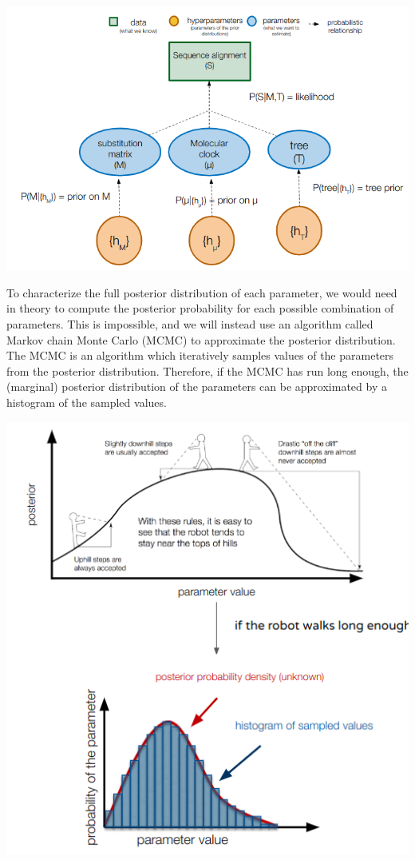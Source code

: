 \documentclass[
  letterpaper,
]{book}
\begin{document}
\includegraphics{assets/images/chapters/phylogenomics/24.png}

To characterize the full posterior distribution of each parameter, we
would need in theory to compute the posterior probability for each
possible combination of parameters. This is impossible, and we will
instead use an algorithm called Markov chain Monte Carlo (MCMC) to
approximate the posterior distribution. The MCMC is an algorithm which
iteratively samples values of the parameters from the posterior
distribution. Therefore, if the MCMC has run long enough, the (marginal)
posterior distribution of the parameters can be approximated by a
histogram of the sampled values.

\includegraphics{assets/images/chapters/phylogenomics/25.png}
\end{document}

